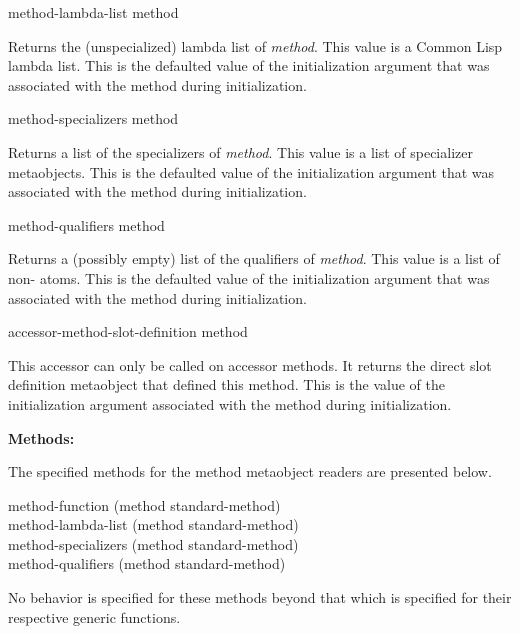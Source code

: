 \begin{defun}
method-lambda-list method

Returns the (unspecialized) lambda list of \emph{method}. This value is a Common Lisp
lambda list. This is the defaulted value of the  initialization
argument that was associated with the method during initialization.
\end{defun}

\begin{defun}
method-specializers method

Returns a list of the specializers of \emph{method}. This value is a list of
specializer metaobjects. This is the defaulted value of the 
initialization argument that was associated with the method during
initialization.
\end{defun}

\begin{defun}
method-qualifiers method

Returns a (possibly empty) list of the qualifiers of \emph{method}. This value
is a list of non- atoms. This is the defaulted value of the 
initialization argument that was associated with the method during
initialization.
\end{defun}

\begin{defun}
accessor-method-slot-definition method

This accessor can only be called on accessor methods. It returns the direct slot
definition metaobject that defined this method. This is the value of the
 initialization argument associated with the method during
initialization.
\end{defun}

\textbf{Methods:}

The specified methods for the method metaobject readers are presented below.

\begin{defun}
method-function (method standard-method) \\
method-lambda-list (method standard-method) \\
method-specializers (method standard-method) \\
method-qualifiers (method standard-method)

No behavior is specified for these methods beyond that which is specified for
their respective generic functions.
\end{defun}

